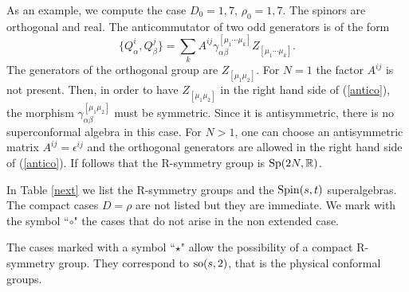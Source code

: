 \documentclass[a4paper,12pt]{article}
\begin{document}
As an example, we compute the case $D_0=1,7$, $\rho_0=1,7$. The
spinors are orthogonal and real. The anticommutator of two odd
generators is of the form
\begin{equation}\{Q_\alpha^i,Q_\beta^j\}=\sum_k A^{ij}
\gamma_{\alpha\beta}^{[\mu_1\cdots \mu_k]}Z_{[\mu_1\cdots
\mu_k]}.\label{antico}\end{equation}  The generators of the
orthogonal group are $Z_{[\mu_1 \mu_2]}$. For $N=1$ the factor
$A^{ij}$ is not present. Then, in order to have $Z_{[\mu_1
\mu_2]}$ in the right hand side of (\ref{antico}), the morphism
$\gamma^{[\mu_1 \mu_2]}_{\alpha\beta}$ must be symmetric. Since it
is antisymmetric, there is no superconformal algebra in this case.
For $N>1$, one can choose an antisymmetric matrix
$A^{ij}=\epsilon^{ij}$ and the orthogonal generators are allowed
in the right hand side of (\ref{antico}). If follows that the
R-symmetry group is ${\rm Sp}(2N,\mathbb{R})$.

In Table \ref{next} we list the R-symmetry groups and the ${\rm
Spin}(s,t)$ superalgebras. The compact cases $D=\rho$ are not
listed but they are immediate. We mark with the symbol ``$\circ$"
the cases that do not arise in the  non extended case.

The cases  marked with a symbol ``$\star$" allow the possibility
of a compact R-symmetry group. They correspond to ${\rm so}(s,2)$,
that is the physical conformal groups.
\end{document}
